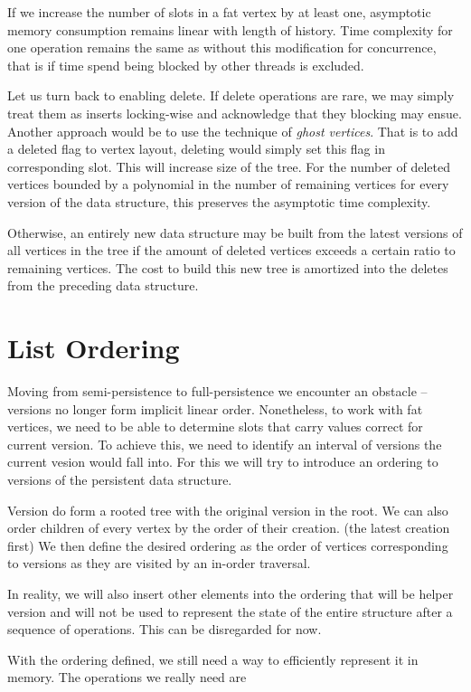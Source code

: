 If we increase the number of slots in a fat vertex by at least one, asymptotic memory consumption remains linear with length of history. Time complexity for one operation remains the same as without this modification for concurrence, that is if time spend being blocked by other threads is excluded.

Let us turn back to enabling delete. If delete operations are rare, we may simply treat them as inserts locking-wise and acknowledge that they blocking may ensue. Another approach would be to use the technique of \textit{ghost vertices}. That is to add a deleted flag to vertex layout, deleting would simply set this flag in corresponding slot. This will increase size of the tree. For the number of deleted vertices bounded by a polynomial in the number of remaining vertices for every version of the data structure, this preserves the asymptotic time complexity. 

Otherwise, an entirely new data structure may be built from the latest versions of all vertices in the tree if the amount of deleted vertices exceeds a certain ratio to remaining vertices. The cost to build this new tree is amortized into the deletes from the preceding data structure.

\section{List Ordering}

Moving from semi-persistence to full-persistence we encounter an obstacle -- versions no longer form implicit linear order. Nonetheless, to work with fat vertices, we need to be able to determine slots that carry values correct for current version. To achieve this, we need to identify an interval of versions the current vesion would fall into. For this we will try to introduce an ordering to versions of the persistent data structure.

Version do form a rooted tree with the original version in the root. We can also order children of every vertex by the order of their creation. (the latest creation first) We then define the desired ordering as the order of vertices corresponding to versions as they are visited by an in-order traversal.

In reality, we will also insert other elements into the ordering that will be helper version and will not be used to represent the state of the entire structure after a sequence of operations. This can be disregarded for now.

With the ordering defined, we still need a way to efficiently represent it in memory. The operations we really need are

